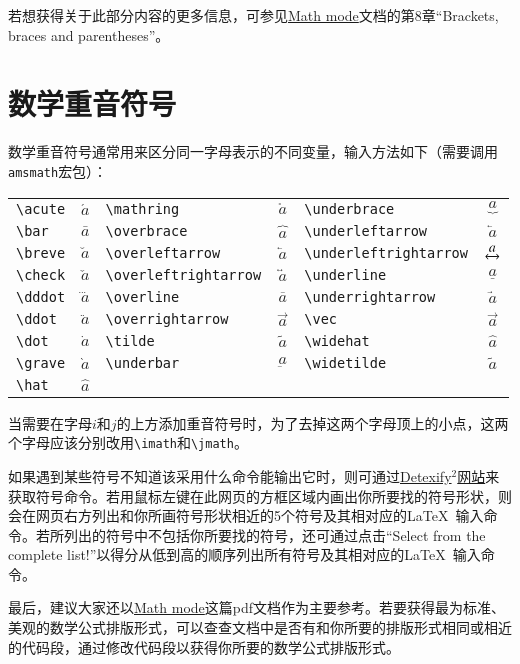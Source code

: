 若想获得关于此部分内容的更多信息，可参见\href{http://tug.ctan.org/cgi-bin/ctanPackageInformation.py?id=voss-mathmode}{Math mode}文档的第8章“Brackets, braces and parentheses”。

\section{数学重音符号}
数学重音符号通常用来区分同一字母表示的不同变量，输入方法如下（需要调用\verb|amsmath|宏包）：

\vspace{0.5em}\noindent{}\begin{tabularx}{\textwidth}{Xc|Xc|Xc}
	\verb|\acute| & $\acute{a}$ & \verb|\mathring| & $\mathring{a}$           & \verb|\underbrace| & $\underbrace{a}$          \\
	\verb|\bar| & $\bar{a}$   & \verb|\overbrace| & $\overbrace{a}$          & \verb|\underleftarrow| & $\underleftarrow{a}$      \\
	\verb|\breve| & $\breve{a}$ & \verb|\overleftarrow| & $\overleftarrow{a}$      & \verb|\underleftrightarrow| & $\underleftrightarrow{a}$ \\
	\verb|\check| & $\check{a}$ & \verb|\overleftrightarrow| & $\overleftrightarrow{a}$ & \verb|\underline| & $\underline{a}$           \\
	\verb|\dddot| & $\dddot{a}$ & \verb|\overline| & $\overline{a}$           & \verb|\underrightarrow| & $\underrightarrow{a}$     \\
	\verb|\ddot| & $\ddot{a}$  & \verb|\overrightarrow| & $\overrightarrow{a}$     & \verb|\vec| & $\vec{a}$                 \\
	\verb|\dot| & $\dot{a}$   & \verb|\tilde| & $\tilde{a}$              & \verb|\widehat| & $\widehat{a}$             \\
	\verb|\grave| & $\grave{a}$ & \verb|\underbar| & $\underbar{a}$           & \verb|\widetilde| & $\widetilde{a}$           \\
	\verb|\hat| & $\hat{a}$
\end{tabularx}\vspace{0.5em}
 当需要在字母$i$和$j$的上方添加重音符号时，为了去掉这两个字母顶上的小点，这两个字母应该分别改用\verb|\imath|和\verb|\jmath|。

如果遇到某些符号不知道该采用什么命令能输出它时，则可通过\href{http://detexify.kirelabs.org/classify.html}{Detexify$^2$网站}来获取符号命令。若用鼠标左键在此网页的方框区域内画出你所要找的符号形状，则会在网页右方列出和你所画符号形状相近的5个符号及其相对应的\LaTeX~输入命令。若所列出的符号中不包括你所要找的符号，还可通过点击“Select from the complete list!”以得分从低到高的顺序列出所有符号及其相对应的\LaTeX~输入命令。

最后，建议大家还以\href{http://tug.ctan.org/cgi-bin/ctanPackageInformation.py?id=voss-mathmode}{Math mode}这篇pdf文档作为主要参考。若要获得最为标准、美观的数学公式排版形式，可以查查文档中是否有和你所要的排版形式相同或相近的代码段，通过修改代码段以获得你所要的数学公式排版形式。

